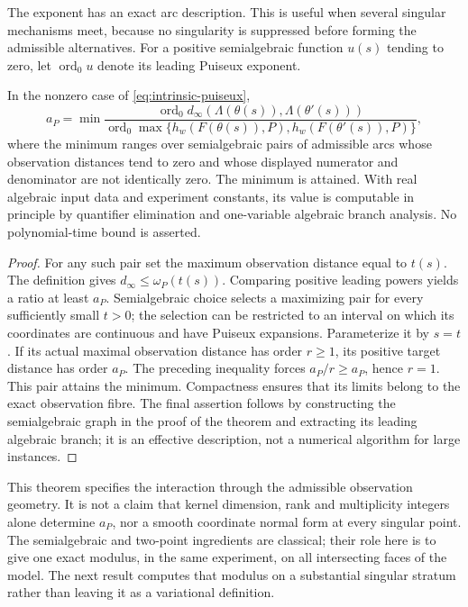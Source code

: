The exponent has an exact arc description. This is useful when several
singular mechanisms meet, because no singularity is suppressed before
forming the admissible alternatives. For a positive semialgebraic
function $u(s)$ tending to zero, let $\operatorname{ord}_0u$ denote
its leading Puiseux exponent.

\begin{corollary}\label{cor:arc-order}
In the nonzero case of \eqref{eq:intrinsic-puiseux},
\begin{equation}\label{eq:arc-order}
 a_P=\min\frac{
 \operatorname{ord}_0d_\infty(\Lambda(\theta(s)),\Lambda(\theta'(s)))}{
 \operatorname{ord}_0\max\{h_w(F(\theta(s)),P),h_w(F(\theta'(s)),P)\}},
\end{equation}
where the minimum ranges over semialgebraic pairs of admissible arcs
whose observation distances tend to zero and whose displayed numerator
and denominator are not identically zero. The minimum is attained.
With real algebraic input data and experiment constants, its value is
computable in principle by quantifier elimination and one-variable
algebraic branch analysis. No polynomial-time bound is asserted.
\end{corollary}
\begin{proof}
For any such pair set the maximum observation distance equal to $t(s)$.
The definition gives $d_\infty\le\omega_P(t(s))$. Comparing positive
leading powers yields a ratio at least $a_P$. Semialgebraic choice
selects a maximizing pair for every sufficiently small $t>0$; the
selection can be restricted to an interval on which its coordinates
are continuous and have Puiseux expansions. Parameterize it by $s=t$.
If its actual maximal observation distance has order $r\ge1$, its
positive target distance has order $a_P$. The preceding inequality
forces $a_P/r\ge a_P$, hence $r=1$. This pair attains the minimum.
Compactness ensures that its limits belong to the exact observation
fibre. The final assertion follows by constructing the semialgebraic
graph in the proof of the theorem and extracting its leading algebraic
branch; it is an effective description, not a numerical algorithm for
large instances.
\end{proof}

This theorem specifies the interaction through the admissible
observation geometry. It is not a claim that kernel dimension, rank
and multiplicity integers alone determine $a_P$, nor a smooth
coordinate normal form at every singular point. The semialgebraic
and two-point ingredients are classical; their role here is to give
one exact modulus, in the same experiment, on all intersecting faces
of the model. The next result computes that modulus on a substantial
singular stratum rather than leaving it as a variational definition.


